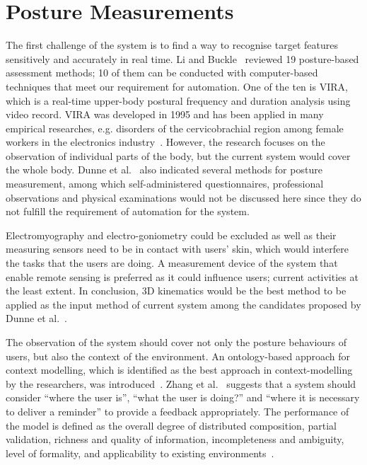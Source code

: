 \section{Posture Measurements}
The first challenge of the system is to find a way to recognise target features sensitively and accurately in real time. Li and Buckle~\cite{work_musculo_risks_posture} reviewed 19 posture-based assessment methods; 10 of them can be conducted with computer-based techniques that meet our requirement for automation. One of the ten is VIRA, which is a real-time upper-body postural frequency and duration analysis using video record. VIRA was developed in 1995 and has been applied in many empirical researches, e.g. disorders of the cervicobrachial region among female workers in the electronics industry~\cite{vira_disorder_electronics}. However, the research focuses on the observation of individual parts of the body, but the current system would cover the  whole body. Dunne et al.~\cite{wearable_spinal_posture} also indicated several methods for posture measurement, among which self-administered questionnaires, professional observations and physical examinations would not be discussed here since they do not fulfill the requirement of automation for the system.

Electromyography and electro-goniometry could be excluded as well as their measuring sensors need to be in contact with users’ skin, which would interfere the tasks that the users are doing. A measurement device of the system that enable remote sensing is preferred as it could influence users; current activities at the least extent. In conclusion, 3D kinematics would be the best method to be applied as the input method of current system among the candidates proposed by Dunne et al.~\cite{wearable_spinal_posture}.

The observation of the system should cover not only the posture behaviours of users, but also the context of the environment. An ontology-based approach for context modelling, which is identified as the best approach in context-modelling by the researchers, was introduced~\cite{contextaware_reminder_living_behaviour}. Zhang et al.~\cite{contextaware_reminder_living_behaviour} suggests that a system should consider “where the user is”, “what the user is doing?” and “where it is necessary to deliver a reminder” to provide a feedback appropriately. The performance of the model is defined as the overall degree of distributed composition, partial validation, richness and quality of information, incompleteness and ambiguity, level of formality, and applicability to existing environments~\cite{contextaware_reminder_living_behaviour}.

